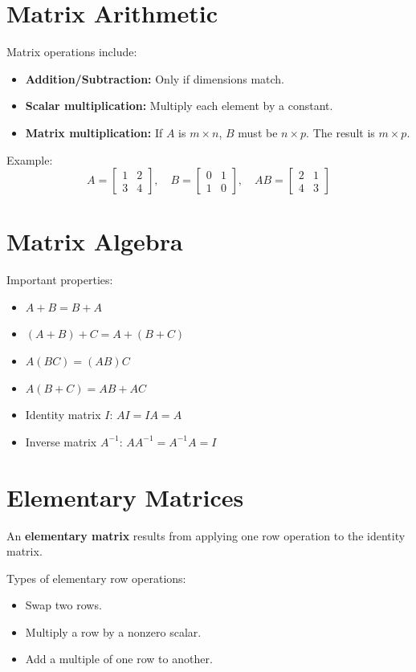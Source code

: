 \documentclass[12pt]{article}
\begin{document}
	\section{Matrix Arithmetic}
	Matrix operations include:
	\begin{itemize}
		\item \textbf{Addition/Subtraction:} Only if dimensions match.
		\item \textbf{Scalar multiplication:} Multiply each element by a constant.
		\item \textbf{Matrix multiplication:} If \( A \) is \( m \times n \), \( B \) must be \( n \times p \). The result is \( m \times p \).
	\end{itemize}
	
	Example:
	\[
	A = \begin{bmatrix} 1 & 2 \\ 3 & 4 \end{bmatrix}, \quad
	B = \begin{bmatrix} 0 & 1 \\ 1 & 0 \end{bmatrix}, \quad
	AB = \begin{bmatrix} 2 & 1 \\ 4 & 3 \end{bmatrix}
	\]
	
	\section{Matrix Algebra}
	Important properties:
	\begin{itemize}
		\item \( A + B = B + A \)
		\item \( (A + B) + C = A + (B + C) \)
		\item \( A(BC) = (AB)C \)
		\item \( A(B + C) = AB + AC \)
		\item Identity matrix \( I \): \( AI = IA = A \)
		\item Inverse matrix \( A^{-1} \): \( AA^{-1} = A^{-1}A = I \)
	\end{itemize}
	
	\newpage
	
	\section{Elementary Matrices}
	An \textbf{elementary matrix} results from applying one row operation to the identity matrix.
	
	Types of elementary row operations:
	\begin{itemize}
		\item Swap two rows.
		\item Multiply a row by a nonzero scalar.
		\item Add a multiple of one row to another.
	\end{itemize}
	
\end{document}
